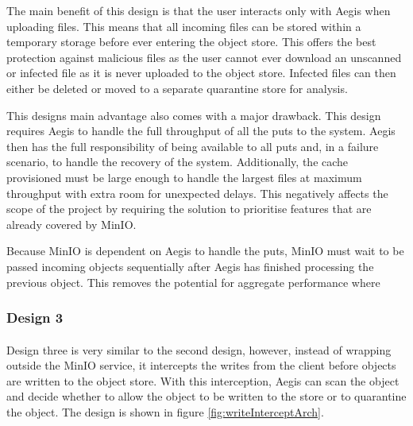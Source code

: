 \documentclass[12pt, conference, final, a4paper, onecolumn, compsoc]{IEEEtran}
\begin{document}
    The main benefit of this design is that the user interacts only with Aegis
    when uploading files. This means that all incoming files can be stored
    within a temporary storage before ever entering the object store. This
    offers the best protection against malicious files as the user cannot
    ever download an unscanned or infected file as it is never uploaded to the
    object store. Infected files can then either be deleted or moved to a
    separate quarantine store for analysis.

    This designs main advantage also comes with a major drawback. This design
    requires Aegis to handle the full throughput of all the puts to the system.
    Aegis then has the full responsibility of being available to all puts and,
    in a failure scenario, to handle the recovery of the system. Additionally,
    the cache provisioned must be large enough to handle the largest files at
    maximum throughput with extra room for unexpected delays. This negatively
    affects the scope of the project by requiring the solution to prioritise
    features that are already covered by MinIO.


    Because MinIO is dependent on Aegis to handle the puts, MinIO must wait to
    be passed incoming objects sequentially after Aegis has finished processing
    the previous object. This removes the potential for aggregate performance where


    \subsubsection*{Design 3}
    \paragraph{}


    Design three is very similar to the second design, however, instead of wrapping
    outside the MinIO service, it intercepts the writes from the client before
    objects are written to the object store. With this interception, Aegis can scan
    the object and decide whether to allow the object to be written to the store
    or to quarantine the object. The design is shown in figure
    \ref{fig:writeInterceptArch}.
\end{document}
